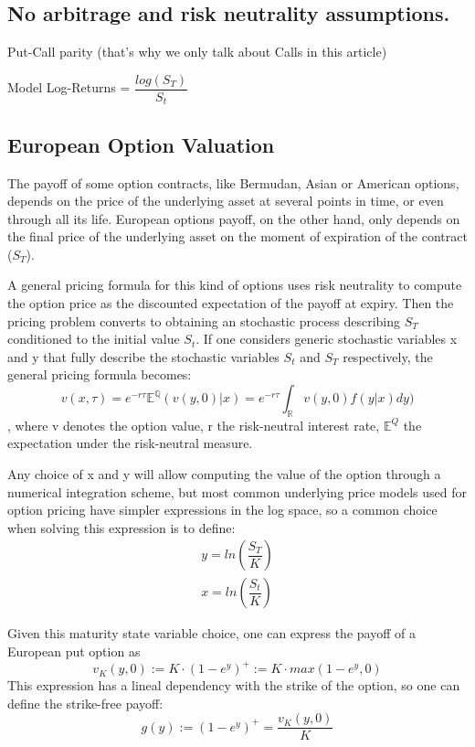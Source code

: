 \documentclass[12,twoside]{mammeTFM}
\theoremstyle{definition}
\theoremstyle{remark}
\newcommand{\E}{\ensuremath{\mathbb{E}}}
\newcommand{\Q}{\ensuremath{\mathbb{Q}}}
\newcommand{\R}{\ensuremath{\mathbb{R}}}
\begin{document}
\subsection{No arbitrage and risk neutrality assumptions.}

Put-Call parity (that's why we only talk about Calls in this article)

Model Log-Returns = $\dfrac{log(S_T)}{S_t}$

\subsection{European Option Valuation} \label{subsec:european_option_valuation}
The payoff of some option contracts, like Bermudan, Asian or American options, depends on the price of the underlying asset at several points in time, or even through all its life. European options payoff, on the other hand, only depends on the final price of the underlying asset on the moment of expiration of the contract ($S_T$). 

A general pricing formula for this kind of options uses risk neutrality to compute the option price as the discounted expectation of the payoff at expiry. Then the pricing problem converts to obtaining an stochastic process describing $S_T$ conditioned to the initial value $S_t$. If one considers generic stochastic variables x and y that fully describe the stochastic variables $S_t$ and $S_T$ respectively, the general pricing formula becomes:
\begin{equation}
\label{eq:integral_option_valuation}
v(x, \tau)  = e^{-r \tau}\E^{\Q}(v(y, 0)|x)  = e^{-r\tau} \int_{\R}v(y,0)f(y|x)dy)
\end{equation}
, where v denotes the option value, r the risk-neutral interest rate, $\E^Q$ the expectation under the risk-neutral measure.

Any choice of x and y will allow computing the value of the option through a numerical integration scheme, but most common underlying price models used for option pricing have simpler expressions in the log space, so a common choice when solving this expression is to define:
\begin{align}
\label{eq:y}
y = ln \left(\dfrac{S_T}{K} \right) \\
\label{eq:x}
x = ln \left(\dfrac{S_t}{K} \right)
\end{align}

Given this maturity state variable choice, one can express the payoff of a European put option as
\begin{equation} \label{eq:european_payoff}
v_{K}(y, 0) := K \cdot (1 - e^y)^{+} := K \cdot max(1 - e^y, 0)
\end{equation}
This expression has a lineal dependency with the strike of the option, so one can define the strike-free payoff:
\begin{equation}
g(y) := (1 - e^y)^{+} = \dfrac{v_{K}(y, 0)}{K}
\end{equation}
\end{document}
